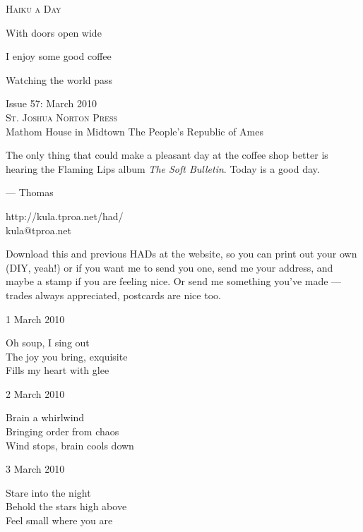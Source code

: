 \documentclass[12pt]{article}
\begin{document}
\begin{center}
{\fontsize{36}{48}\selectfont \textsc{Haiku a Day }}
\end{center}

\vspace*{3.5cm}

{\fontsize{26}{52}\selectfont 

With doors open wide

I enjoy some good coffee

Watching the world pass

}

\vspace*{5.0cm}
\begin{center}
{\large{Issue 57: March 2010}} \\[5mm]
{\fontsize{8}{8}\selectfont  \textsc{ St. Joshua Norton Press }} \\[1mm]
{\fontsize{6}{6}\selectfont Mathom House in Midtown \textbar The People's Republic of Ames }
\end{center}


\newpage

The only thing that could make a pleasant day at the coffee shop better
is hearing the Flaming Lips album {\em The Soft Bulletin}. Today is a
good day.


--- Thomas

http://kula.tproa.net/had/ \\
kula@tproa.net

Download this and previous HADs at the website, so you can
print out your own (DIY, yeah!) or if you want me to send
you one, send me your address, and maybe a stamp if you
are feeling nice. Or send me something you've made ---
trades always appreciated, postcards are nice too.

\vspace*{2cm}

1 March 2010

Oh soup, I sing out \\
The joy you bring, exquisite \\
Fills my heart with glee

2 March 2010

Brain a whirlwind \\
Bringing order from chaos \\
Wind stops, brain cools down

3 March 2010

Stare into the night \\
Behold the stars high above \\
Feel small where you are
\end{document}
